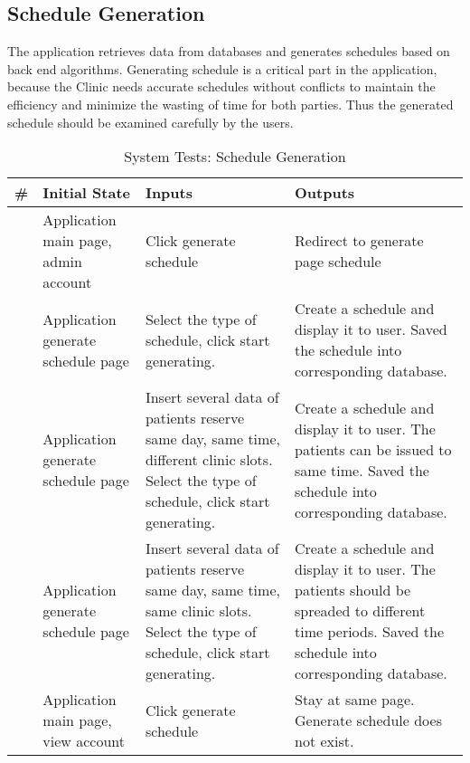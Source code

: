 \documentclass[12pt]{article}
\newcounter{TestCounter}
\begin{document}
\subsection{Schedule Generation} 
The application retrieves data from databases and generates schedules based on back end algorithms. Generating schedule is a critical part in the application, because the Clinic needs accurate schedules without conflicts to maintain the efficiency and minimize the wasting of time for both parties. Thus the generated schedule should be examined carefully by the users. 
\begin{center}
	\begin{longtable}{c>{\raggedright\arraybackslash}p{4.8cm} >{\raggedright\arraybackslash}p{3cm}>{\raggedright\arraybackslash}p{3cm}}
		\caption{System Tests: Schedule Generation}\label{ScheduleGeneration_SystemTests}\\
		\toprule
		\bf \# & \bf Initial State & \bf Inputs & \bf Outputs \\\midrule
		\stepcounter{TestCounter}\arabic{TestCounter} 
		& Application main page, admin account
		& Click generate schedule
		& Redirect to generate page schedule
		\\\midrule
		\stepcounter{TestCounter}\arabic{TestCounter} 
		& Application generate schedule page 
		& Select the type of schedule, click start generating.
		& Create a schedule and display it to user. Saved the schedule into corresponding database.
		\\\midrule
		\stepcounter{TestCounter}\arabic{TestCounter} 
		& Application generate schedule page
		& Insert several data of patients reserve same day, same time, different clinic slots. Select the type of schedule, click start generating.
		& Create a schedule and display it to user. The patients can be issued to same time. Saved the schedule into corresponding database.
		\\\midrule
		\stepcounter{TestCounter}\arabic{TestCounter} 
		& Application generate schedule page
		& Insert several data of patients reserve same day, same time, same clinic slots. Select the type of schedule, click start generating.
		& Create a schedule and display it to user. The patients should be spreaded to different time periods. Saved the schedule into corresponding database.
		\\\midrule
		\stepcounter{TestCounter}\arabic{TestCounter} 
		& Application main page, view account
		& Click generate schedule
		& Stay at same page.
		Generate schedule does not exist.
		\\\midrule
		\bottomrule
	\end{longtable}
\end{center}
\end{document}

